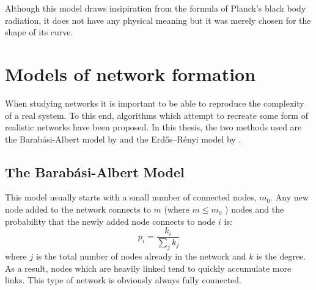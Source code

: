 Although this model draws insipiration from the formula of Planck's
black body radiation, it does not have any physical meaning but it
was merely chosen for the shape of its curve.






\section{Models of network formation}\label{sec:creating_nw}

When studying networks it is important to be able to reproduce the complexity
of a real system. To this end, algorithms which attempt to recreate some form
of realistic networks have been proposed. In this thesis, the two methods used
are the Barab{\'a}si-Albert model by \citet{albert2002statistical} and the
Erdős–Rényi model by \citet{erdHos1960evolution}.

\subsection{The Barab{\'a}si-Albert Model}

This model usually starts with a small number of connected nodes,
$m_0$.  Any new node added to the network connects to $m$ (where $m
\leq m_0$ ) nodes and the probability that the newly added node
connects to node $i$ is:
\begin{equation}
  \label{eq:ba_nw}
  p_i = \frac{k_i}{\sum_j k_j}
\end{equation}
where $j$ is the total number of nodes already in the network and $k$ is the degree.
As a result, nodes which are heavily linked tend to quickly accumulate more links.
This type of network is obviously always fully connected.


